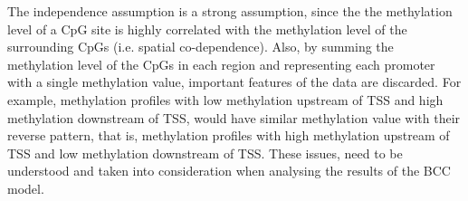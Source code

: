 The independence assumption is a strong assumption, since the the methylation level of a CpG site is highly correlated with the methylation level of the surrounding CpGs (i.e. spatial co-dependence). Also, by summing the methylation level of the CpGs in each region and representing each promoter with a single methylation value, important features of the data are discarded. For example, methylation profiles with low methylation upstream of TSS and high methylation downstream of TSS, would have similar methylation value with their reverse pattern, that is, methylation profiles with high methylation upstream of TSS and low methylation downstream of TSS. These issues, need to be understood and taken into consideration when analysing the results of the BCC model.